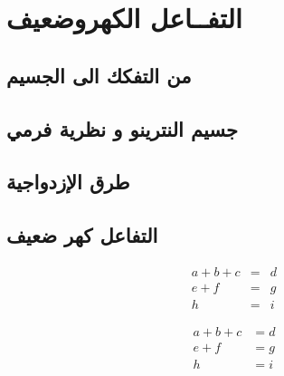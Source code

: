 \chapter{التفــاعل الكهروضعيف}

\label{Chapter6}


\section{من التفكك الى الجسيم}

\section{جسيم النترينو و نظرية فرمي}

\section{طرق الإزدواجية}

\section{التفاعل كهر ضعيف}

\begin{equation}
	\begin{array}{ccl}
		a + b + c & = & d \\
		e + f     & = & g \\
		h         & = & i
	\end{array}
\end{equation}

\begin{equation}
	\begin{aligned}
		a + b + c & =  d \\
		e + f     & =  g \\
		h         & =  i
	\end{aligned}
\end{equation}